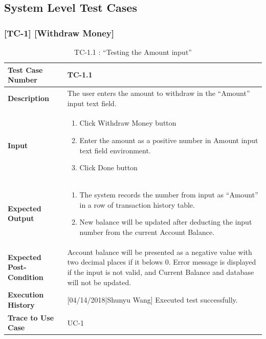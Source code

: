 \documentclass[12pt]{article}
\begin{document}
\subsection{System Level Test Cases}

\subsubsection{[TC-1] [Withdraw Money]} \label{tc:1}
\begin{table}[H]

\caption{ TC-1.1 : “Testing the Amount input”}
\begin{center}
\begin{tabular}{|p{5.5	cm}|p{11cm}|}
\hline
\bf Test Case Number & 
TC-1.1 \\
\hline
\bf Description & 
The user enters the amount to withdraw in the “Amount” input text field.\\
\hline
\bf Input & 
\begin{enumerate}
  \item Click Withdraw Money button
  \item Enter the amount as a positive number in Amount input text field environment.
  \item Click Done button
\end{enumerate} \\
\hline
\bf Expected Output & 
\begin{enumerate}
  \item The system records the number from input as “Amount” in a row of transaction history table.
  \item New balance will be updated after deducting the input number from the current Account Balance.
\end{enumerate} \\
\hline
\bf Expected Post-Condition & 
Account balance will be presented as a negative value with two decimal places if it belows 0. Error message is displayed if the input is not valid, 
and Current Balance and database will not be updated.\\
\hline
\bf Execution History & 
[04/14/2018|Shunyu Wang] Executed test successfully.\\
\hline
\bf Trace to Use Case & 
UC-1\\
\hline

\end{tabular}
\end{center}
\end{table}
\end{document}
